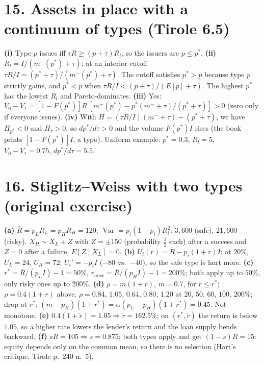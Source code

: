 \documentclass[11pt,a4paper]{article}
\begin{document}
\section*{15. Assets in place with a continuum of types (Tirole 6.5)}

\textbf{(i)} Type $p$ issues iff $\tau R\ge(p+\tau)R_l$, so the issuers are $p\le p^*$.
\textbf{(ii)} $R_l=I/(m^-(p^*)+\tau)$; at an interior cutoff $\tau R/I=(p^*+\tau)/(m^-(p^*)+\tau)$. The cutoff
satisfies $p^*>\underline p$ because type $\underline p$ strictly gains, and $p^*<\bar p$ when
$\tau R/I<(\bar p+\tau)/(E[p]+\tau)$. The highest $p^*$ has the lowest $R_l$ and Pareto-dominates.
\textbf{(iii)} Yes: $V_0-V_1=[1-F(p^*)]R\,[m^+(p^*)-p^*(m^-+\tau)/(p^*+\tau)]>0$ (zero only if everyone issues).
\textbf{(iv)} With $H=(\tau R/I)(m^-+\tau)-(p^*+\tau)$, we have $H_{p^*}<0$ and $H_\tau>0$, so $dp^*/d\tau>0$ and the
volume $F(p^*)I$ rises (the book prints $[1-F(p^*)]I$, a typo). Uniform example: $p^*=0.3$, $R_l=5$,
$V_0-V_1=0.75$, $dp^*/d\tau=5.5$.

\section*{16. Stiglitz--Weiss with two types (original exercise)}

\textbf{(a)} $\bar R=p_LR_L=p_HR_H=120$; $\operatorname{Var}=p_i(1-p_i)R_i^2$: $3{,}600$ (safe), $21{,}600$ (risky).
$X_H\sim X_L+Z$ with $Z=\pm150$ (probability $\tfrac12$ each) after a success and $Z=0$ after a failure, $E[Z\mid X_L]=0$.
\textbf{(b)} $U_i(r)=\bar R-p_i(1+r)I$: at $20\%$, $U_L=24$, $U_H=72$; $U_i'=-p_iI$ ($-80$ vs.\ $-40$), so the safe type is hurt more.
\textbf{(c)} $r^*=\bar R/(p_LI)-1=50\%$, $r_{max}=\bar R/(p_HI)-1=200\%$; both apply up to $50\%$, only risky ones up to $200\%$.
\textbf{(d)} $\rho=m(1+r)$, $m=0.7$, for $r\le r^*$; $\rho=0.4(1+r)$ above. $\rho=0.84,\,1.05,\,0.64,\,0.80,\,1.20$ at
$20,\,50,\,60,\,100,\,200\%$; drop at $r^*$: $(m-p_H)(1+r^*)=\alpha(p_L-p_H)(1+r^*)=0.45$. Not monotone.
\textbf{(e)} $0.4(1+\tilde r)=1.05\Rightarrow\tilde r=162.5\%$; on $(r^*,\tilde r)$ the return is below $1.05$, so a higher rate lowers
the lender's return and the loan supply bends backward.
\textbf{(f)} $s\bar R=105\Rightarrow s=0.875$; both types apply and get $(1-s)\bar R=15$: equity depends only on the common mean,
so there is no selection (Hart's critique, Tirole p.~240 n.~5).
\end{document}
